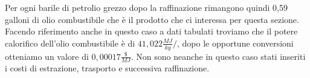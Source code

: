 Per ogni barile di petrolio grezzo dopo la raffinazione rimangono quindi 0,59 galloni di olio combustibile che è il prodotto che ci interessa per questa sezione.
Facendo riferimento anche in questo caso a dati tabulati troviamo che il potere calorifico dell'olio combustibile è di $41,022 \frac{MJ}{kg}/$, dopo le opportune conversioni otteniamo un valore di $0,00017\frac{\$}{MJ}$.
Non sono neanche in questo caso stati inseriti i costi di estrazione, trasporto e successiva raffinazione.